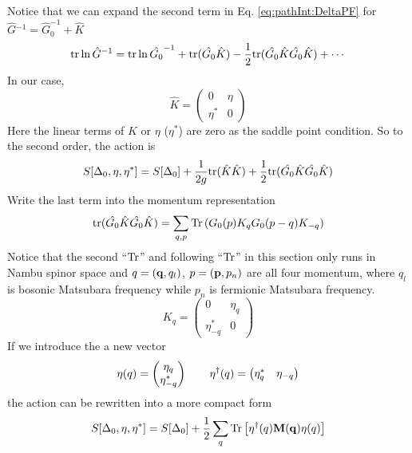 Notice that we can expand the second term in Eq. \ref{eq:pathInt:DeltaPF} for $\hat{G}{}^{-1}=\hat{G}_{0}^{-1}+\hat{K}$
\begin{equation}\label{eq:pathInt:expand}
\text{tr}\ln \hat{G}^{-1}=\text{tr}\ln\hat{G_{0}}^{-1}+\text{tr}(\hat{G_{0}}\hat{K})-\frac{1}{2}\text{tr}(\hat{G_{0}}\hat{K}\hat{G_{0}}\hat{K})+\cdots
\end{equation}
In our case,
\begin{equation}
\hat{K}=\begin{pmatrix}
0&\eta\\
\eta^{*}&0
\end{pmatrix}
\end{equation}
Here the linear terms of $\hat{K}$ or $\eta$ ($\eta^{*}$) are zero as the saddle point condition.  So to the second order, the action is 
\begin{equation}\label{eq:pathInt:DeltaActionGaussian}
S[\Delta_{0},\eta,\eta^{*}]=S[\Delta_{0}]+
	\frac{1}{2g}\text{tr}(\hat{K}\hat{K})+\frac{1}{2}\text{tr}(\hat{G_{0}}\hat{K}\hat{G_{0}}\hat{K})
\end{equation}
Write the last term into the momentum representation
\begin{equation}
\text{tr}(\hat{G_{0}}\hat{K}\hat{G_{0}}\hat{K})=\sum_{q,p}\text{Tr}\left(G_{0}({p})K_{q}G_{0}{}({p-q})K_{-q}\right)
\end{equation}
Notice that the second ``$\text{Tr}$'' and following ``$\text{Tr}$'' in this section only runs in Nambu spinor space and $q={(\mathbf{q},q_{l})}$, $p=(\mathbf{p},p_{n})$ are all four momentum, where $q_{l}$ is bosonic Matsubara frequency while $p_{n}$ is fermionic Matsubara frequency.
\begin{equation}
K_{q}=\begin{pmatrix}
0&\eta_{q}\\
\eta^{*}_{-q}&0
\end{pmatrix}
\end{equation}
If we introduce the a new vector 
\begin{equation}
\eta{(q)}=\begin{pmatrix}\eta_{q}\\\eta^{*}_{-q}\end{pmatrix}\qquad
\eta^{\dagger}{(q)}=\begin{pmatrix}\eta^{*}_{q}&\eta_{-q}\end{pmatrix}
\end{equation}
the action can be rewritten into a more compact form
\begin{equation}
S[\Delta_{0},\eta,\eta^{*}]=S[\Delta_{0}]+\frac{1}{2}\sum_{q}\text{Tr}\left[\eta^{\dagger}(q)\mathbf{M(q)}\eta(q)\right]
\end{equation}
